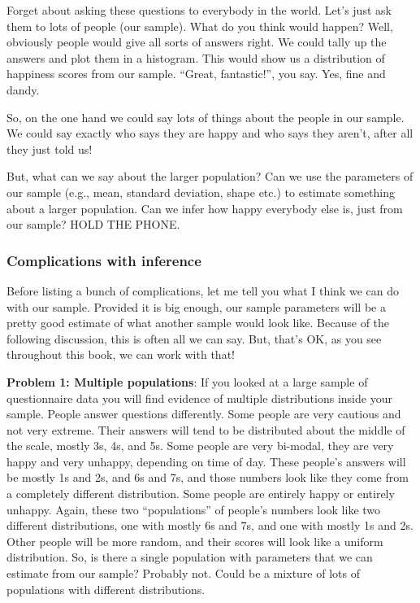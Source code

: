 \documentclass[]{book}
\begin{document}
Forget about asking these questions to everybody in the world. Let's just ask them to lots of people (our sample). What do you think would happen? Well, obviously people would give all sorts of answers right. We could tally up the answers and plot them in a histogram. This would show us a distribution of happiness scores from our sample. ``Great, fantastic!'', you say. Yes, fine and dandy.

So, on the one hand we could say lots of things about the people in our sample. We could say exactly who says they are happy and who says they aren't, after all they just told us!

But, what can we say about the larger population? Can we use the parameters of our sample (e.g., mean, standard deviation, shape etc.) to estimate something about a larger population. Can we infer how happy everybody else is, just from our sample? HOLD THE PHONE.

\hypertarget{complications-with-inference}{%
\subsubsection{Complications with inference}\label{complications-with-inference}}

Before listing a bunch of complications, let me tell you what I think we can do with our sample. Provided it is big enough, our sample parameters will be a pretty good estimate of what another sample would look like. Because of the following discussion, this is often all we can say. But, that's OK, as you see throughout this book, we can work with that!

\textbf{Problem 1: Multiple populations}: If you looked at a large sample of questionnaire data you will find evidence of multiple distributions inside your sample. People answer questions differently. Some people are very cautious and not very extreme. Their answers will tend to be distributed about the middle of the scale, mostly 3s, 4s, and 5s. Some people are very bi-modal, they are very happy and very unhappy, depending on time of day. These people's answers will be mostly 1s and 2s, and 6s and 7s, and those numbers look like they come from a completely different distribution. Some people are entirely happy or entirely unhappy. Again, these two ``populations'' of people's numbers look like two different distributions, one with mostly 6s and 7s, and one with mostly 1s and 2s. Other people will be more random, and their scores will look like a uniform distribution. So, is there a single population with parameters that we can estimate from our sample? Probably not. Could be a mixture of lots of populations with different distributions.
\end{document}
